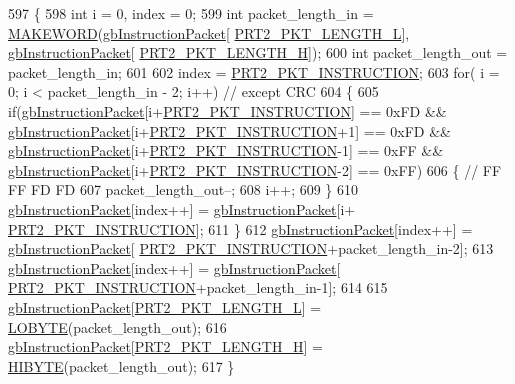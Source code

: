 \begin{DoxyCode}
597 \{
598     \textcolor{keywordtype}{int} i = 0, index = 0;
599     \textcolor{keywordtype}{int} packet\_length\_in = \hyperlink{dynamixel_8h_a6b98c16b8e3e7733dd4063d0b0fac24c}{MAKEWORD}(\hyperlink{classdynamixel2_a298efe9115fdbf77019af1001e801fb4}{gbInstructionPacket}[
      \hyperlink{dynamixel_8h_a9e77ab568957b64786c810967dec8b0c}{PRT2\_PKT\_LENGTH\_L}], \hyperlink{classdynamixel2_a298efe9115fdbf77019af1001e801fb4}{gbInstructionPacket}[
      \hyperlink{dynamixel_8h_a5ea18a21d722bf72217d5408c4d2a868}{PRT2\_PKT\_LENGTH\_H}]);
600     \textcolor{keywordtype}{int} packet\_length\_out = packet\_length\_in;
601 
602     index = \hyperlink{dynamixel_8h_aece9dd9d7c0fa1714d53c568865d79ad}{PRT2\_PKT\_INSTRUCTION};
603     \textcolor{keywordflow}{for}( i = 0; i < packet\_length\_in - 2; i++)  \textcolor{comment}{// except CRC}
604     \{
605         \textcolor{keywordflow}{if}(\hyperlink{classdynamixel2_a298efe9115fdbf77019af1001e801fb4}{gbInstructionPacket}[i+\hyperlink{dynamixel_8h_aece9dd9d7c0fa1714d53c568865d79ad}{PRT2\_PKT\_INSTRUCTION}] == 0xFD && 
      \hyperlink{classdynamixel2_a298efe9115fdbf77019af1001e801fb4}{gbInstructionPacket}[i+\hyperlink{dynamixel_8h_aece9dd9d7c0fa1714d53c568865d79ad}{PRT2\_PKT\_INSTRUCTION}+1] == 0xFD && 
      \hyperlink{classdynamixel2_a298efe9115fdbf77019af1001e801fb4}{gbInstructionPacket}[i+\hyperlink{dynamixel_8h_aece9dd9d7c0fa1714d53c568865d79ad}{PRT2\_PKT\_INSTRUCTION}-1] == 0xFF && 
      \hyperlink{classdynamixel2_a298efe9115fdbf77019af1001e801fb4}{gbInstructionPacket}[i+\hyperlink{dynamixel_8h_aece9dd9d7c0fa1714d53c568865d79ad}{PRT2\_PKT\_INSTRUCTION}-2] == 0xFF)
606         \{   \textcolor{comment}{// FF FF FD FD}
607             packet\_length\_out--;
608             i++;
609         \}
610         \hyperlink{classdynamixel2_a298efe9115fdbf77019af1001e801fb4}{gbInstructionPacket}[index++] = \hyperlink{classdynamixel2_a298efe9115fdbf77019af1001e801fb4}{gbInstructionPacket}[i+
      \hyperlink{dynamixel_8h_aece9dd9d7c0fa1714d53c568865d79ad}{PRT2\_PKT\_INSTRUCTION}];
611     \}
612     \hyperlink{classdynamixel2_a298efe9115fdbf77019af1001e801fb4}{gbInstructionPacket}[index++] = \hyperlink{classdynamixel2_a298efe9115fdbf77019af1001e801fb4}{gbInstructionPacket}[
      \hyperlink{dynamixel_8h_aece9dd9d7c0fa1714d53c568865d79ad}{PRT2\_PKT\_INSTRUCTION}+packet\_length\_in-2];
613     \hyperlink{classdynamixel2_a298efe9115fdbf77019af1001e801fb4}{gbInstructionPacket}[index++] = \hyperlink{classdynamixel2_a298efe9115fdbf77019af1001e801fb4}{gbInstructionPacket}[
      \hyperlink{dynamixel_8h_aece9dd9d7c0fa1714d53c568865d79ad}{PRT2\_PKT\_INSTRUCTION}+packet\_length\_in-1];
614 
615     \hyperlink{classdynamixel2_a298efe9115fdbf77019af1001e801fb4}{gbInstructionPacket}[\hyperlink{dynamixel_8h_a9e77ab568957b64786c810967dec8b0c}{PRT2\_PKT\_LENGTH\_L}] = 
      \hyperlink{dynamixel_8h_a04c0416272e5c07bdf955d803a21688e}{LOBYTE}(packet\_length\_out);
616     \hyperlink{classdynamixel2_a298efe9115fdbf77019af1001e801fb4}{gbInstructionPacket}[\hyperlink{dynamixel_8h_a5ea18a21d722bf72217d5408c4d2a868}{PRT2\_PKT\_LENGTH\_H}] = 
      \hyperlink{dynamixel_8h_a75c5b5f21e837e80c0feb4da9a421f87}{HIBYTE}(packet\_length\_out);
617 \}
\end{DoxyCode}
